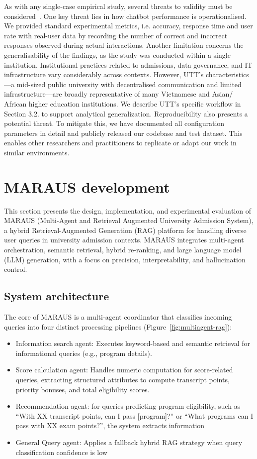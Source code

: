 \documentclass[runningheads]{llncs}
\begin{document}
As with any single-case empirical study, several threats to validity must be considered~\cite{runeson_guidelines_2008}. One key threat lies in how chatbot performance is operationalised. We provided standard experimental metrics, i.e. accuracy, response time and user rate with real-user data by recording the number of correct and incorrect responses observed during actual interactions. Another limitation concerns the generalisability of the findings, as the study was conducted within a single institution. Institutional practices related to admissions, data governance, and IT infrastructure vary considerably across contexts. However, UTT’s characteristics—a mid-sized public university with decentralised communication and limited infrastructure—are broadly representative of many Vietnamese and Asian/ African higher education institutions. We describe UTT’s specific workflow in Section 3.2. to support analytical generalization. Reproducibility also presents a potential threat. To mitigate this, we have documented all configuration parameters in detail and publicly released our codebase and test dataset. This enables other researchers and practitioners to replicate or adapt our work in similar environments.

\section{MARAUS development}
This section presents the design, implementation, and experimental evaluation of MARAUS (Multi-Agent and Retrieval Augmented University Admission System), a hybrid Retrieval-Augmented Generation (RAG) platform for handling diverse user queries in university admission contexts. MARAUS integrates multi-agent orchestration, semantic retrieval, hybrid re-ranking, and large language model (LLM) generation, with a focus on precision, interpretability, and hallucination control.
\subsection{System architecture}
The core of MARAUS is a multi-agent coordinator that classifies incoming queries into four distinct processing pipelines (Figure~\ref{fig:multiagent-rag}):
\begin{itemize}
    \item Information search agent: Executes keyword-based and semantic retrieval for informational queries (e.g., program details).
    \item Score calculation agent: Handles numeric computation for score-related queries, extracting structured attributes to compute transcript points, priority bonuses, and total eligibility scores.
    \item Recommendation agent: for queries predicting program eligibility, such as “With XX transcript points, can I pass [program]?” or “What programs can I pass with XX exam points?”, the system extracts information
    \item General Query agent: Applies a fallback hybrid RAG strategy when query classification confidence is low
\end{itemize}
\end{document}
